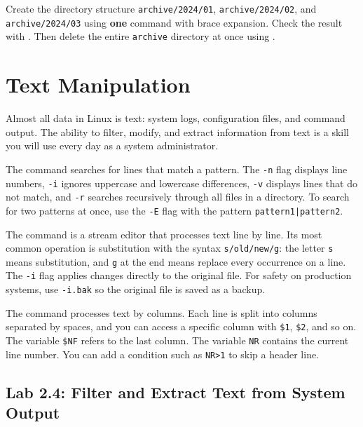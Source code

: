 \begin{challengebox}
Create the directory structure \texttt{archive/2024/01}, \texttt{archive/2024/02}, and \texttt{archive/2024/03} using \textbf{one}  command with brace expansion. Check the result with . Then delete the entire \texttt{archive} directory at once using .
\end{challengebox}

\section{Text Manipulation}
\label{sec:text-manipulation}

Almost all data in Linux is text: system logs, configuration files, and command output. The ability to filter, modify, and extract information from text is a skill you will use every day as a system administrator.

The  command searches for lines that match a pattern. The \texttt{-n} flag displays line numbers, \texttt{-i} ignores uppercase and lowercase differences, \texttt{-v} displays lines that do not match, and \texttt{-r} searches recursively through all files in a directory. To search for two patterns at once, use the \texttt{-E} flag with the pattern \texttt{pattern1|pattern2}.

The  command is a stream editor that processes text line by line. Its most common operation is substitution with the syntax \texttt{s/old/new/g}: the letter \texttt{s} means substitution, and \texttt{g} at the end means replace every occurrence on a line. The \texttt{-i} flag applies changes directly to the original file. For safety on production systems, use \texttt{-i.bak} so the original file is saved as a backup.

The  command processes text by columns. Each line is split into columns separated by spaces, and you can access a specific column with \texttt{\$1}, \texttt{\$2}, and so on. The variable \texttt{\$NF} refers to the last column. The variable \texttt{NR} contains the current line number. You can add a condition such as \texttt{NR>1} to skip a header line.

\subsection*{Lab 2.4: Filter and Extract Text from System Output}

